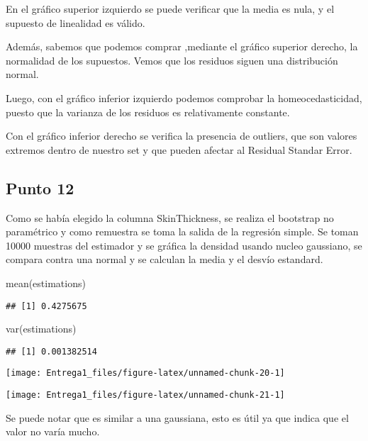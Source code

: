 \documentclass[
]{article}
\newenvironment{Shaded}{\begin{snugshade}}{\end{snugshade}}
\newcommand{\FunctionTok}[1]{\textcolor[rgb]{0.00,0.00,0.00}{#1}}
\newcommand{\NormalTok}[1]{#1}
\begin{document}
En el gráfico superior izquierdo se puede verificar que la media es
nula, y el supuesto de linealidad es válido.

Además, sabemos que podemos comprar ,mediante el gráfico superior
derecho, la normalidad de los supuestos. Vemos que los residuos siguen
una distribución normal.

Luego, con el gráfico inferior izquierdo podemos comprobar la
homeocedasticidad, puesto que la varianza de los residuos es
relativamente constante.

Con el gráfico inferior derecho se verifica la presencia de outliers,
que son valores extremos dentro de nuestro set y que pueden afectar al
Residual Standar Error.

\hypertarget{punto-12}{%
\subsection{Punto 12}\label{punto-12}}

Como se había elegido la columna SkinThickness, se realiza el bootstrap
no paramétrico y como remuestra se toma la salida de la regresión
simple. Se toman 10000 muestras del estimador y se gráfica la densidad
usando nucleo gaussiano, se compara contra una normal y se calculan la
media y el desvío estandard.

\begin{Shaded}
\begin{Highlighting}[]
\FunctionTok{mean}\NormalTok{(estimations)}
\end{Highlighting}
\end{Shaded}

\begin{verbatim}
## [1] 0.4275675
\end{verbatim}

\begin{Shaded}
\begin{Highlighting}[]
\FunctionTok{var}\NormalTok{(estimations)}
\end{Highlighting}
\end{Shaded}

\begin{verbatim}
## [1] 0.001382514
\end{verbatim}

\begin{center}\texttt{[image: Entrega1\_files/figure-latex/unnamed-chunk-20-1]} \end{center}

\begin{center}\texttt{[image: Entrega1\_files/figure-latex/unnamed-chunk-21-1]} \end{center}

Se puede notar que es similar a una gaussiana, esto es útil ya que
indica que el valor no varía mucho.
\end{document}
